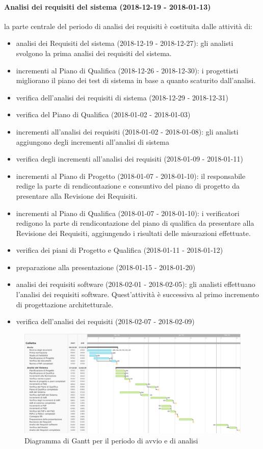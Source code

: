		\paragraph{Analisi dei requisiti del sistema (2018-12-19 - 2018-01-13)\\} la parte centrale del periodo di analisi dei requisiti è costituita dalle attività di:
			\begin{itemize}
				\item analisi dei Requisiti del sistema (2018-12-19 - 2018-12-27): gli analisti svolgono la prima analisi dei requisiti del sistema.
				\item incrementi al Piano di Qualifica (2018-12-26 - 2018-12-30): i progettisti migliorano il piano dei test di sistema in base a quanto scaturito dall'analisi.
				\item verifica dell'analisi dei requisiti di sistema (2018-12-29 - 2018-12-31)
				\item verifica del Piano di Qualifica (2018-01-02 - 2018-01-03)
				\item incrementi all'analisi dei requisiti (2018-01-02 - 2018-01-08): gli analisti aggiungono degli incrementi all'analisi di sistema
				\item verifica degli incrementi all'analisi dei requisiti (2018-01-09 - 2018-01-11)
				\item incrementi al Piano di Progetto (2018-01-07 - 2018-01-10): il responsabile redige la parte di rendicontazione e consuntivo del piano di progetto da presentare alla Revisione dei Requisiti.
				\item incrementi al Piano di Qualifica (2018-01-07 - 2018-01-10): i verificatori redigono la parte di rendicontazione del piano di qualifica da presentare alla Revisione dei Requisiti, aggiungendo i risultati delle misurazioni effettuate.
				\item verifica dei piani di Progetto e Qualifica (2018-01-11 - 2018-01-12)
				\item preparazione alla presentazione (2018-01-15 - 2018-01-20)
				\item analisi dei requisiti software (2018-02-01 - 2018-02-05): gli analisti effettuano l'analisi dei requisiti software. Quest'attività è successiva al primo incremento di progettazione architetturale.
				\item verifica dell'analisi dei requisiti (2018-02-07 - 2018-02-09)				
			\end{itemize}
	\newpage
	\begin{figure}[!hbtp]
		\centering
		\includegraphics[scale=0.5,angle=90]{images/gantt.png}
		\caption{Diagramma di Gantt per il periodo di avvio e di analisi}
	\end{figure}
	\newpage